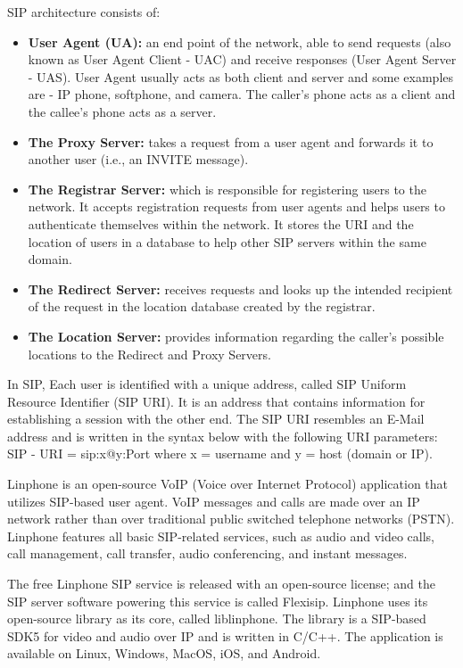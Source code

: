     \noindent SIP architecture consists of:
    \begin{itemize}
        \item \textbf {User Agent (UA):} an end point of the network, able to send requests (also known as User Agent Client - UAC) 
        and receive responses (User Agent Server - UAS). User Agent usually acts as both client and server and some examples 
        are - IP phone, softphone, and camera. The caller’s phone acts as a client and the callee’s phone acts as a server.
        \item \textbf {The Proxy Server:} takes a request from a user agent and forwards it to another user (i.e., an INVITE message).
        \item \textbf {The Registrar Server:} which is responsible for registering users to the network. It accepts registration requests from 
        user agents and helps users to authenticate themselves within the network. It stores the URI and the location of users in a database 
        to help other SIP servers within the same domain.
        \item \textbf {The Redirect Server:} receives requests and looks up the intended recipient of the request in the location database created by the registrar. 
        \item \textbf {The Location Server:} provides information regarding the caller’s possible locations to the Redirect and Proxy Servers.
    \end{itemize}
    \noindent In SIP, Each user is identified with a unique address, called SIP Uniform Resource Identifier (SIP URI). It is an address that contains information for establishing a session with the other end. The SIP URI resembles an E-Mail address and is written in the syntax below with the following URI parameters: 
    SIP - URI = sip:x@y:Port  where x = username and y = host (domain or IP).

    Linphone is an open-source VoIP (Voice over Internet Protocol) application that utilizes SIP-based user agent. VoIP messages and calls are made over an IP network rather than over traditional public switched telephone networks (PSTN). 
    Linphone features all basic SIP-related services, such as audio and video calls, call management, call transfer, audio conferencing, and instant messages. 
    
    \pagebreak

    The free Linphone SIP service is released with an open-source license; and the SIP server software powering this service is called Flexisip. 
    Linphone uses its open-source library as its core, called liblinphone. 
    The library is a SIP-based SDK5 for video and audio over IP and is written in C/C++. 
    The application is available on Linux, Windows, MacOS, iOS, and Android. \\

